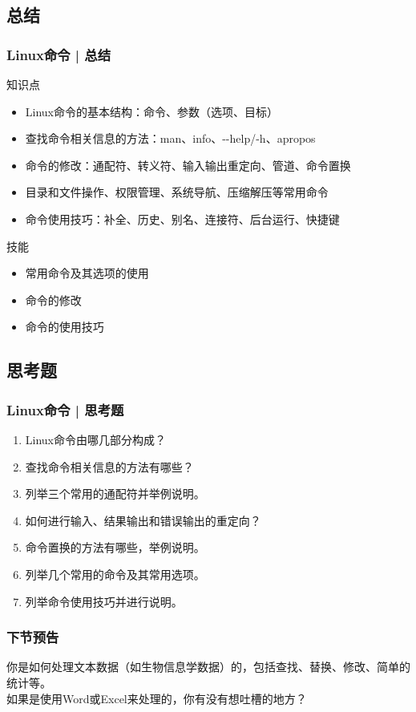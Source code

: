\subsection{总结}
\begin{frame}[fragile]
  \frametitle{Linux命令 | 总结}
  \begin{block}{知识点}
    \begin{itemize}
      \item Linux命令的基本结构：命令、参数（选项、目标）
      \item 查找命令相关信息的方法：man、info、-\!-help/-h、apropos
      \item 命令的修改：通配符、转义符、输入输出重定向、管道、命令置换
      \item 目录和文件操作、权限管理、系统导航、压缩解压等常用命令
      \item 命令使用技巧：补全、历史、别名、连接符、后台运行、快捷键
    \end{itemize}
  \end{block}
  \begin{block}{技能}
    \begin{itemize}
      \item 常用命令及其选项的使用
      \item 命令的修改
      \item 命令的使用技巧
    \end{itemize}
  \end{block}
\end{frame}

\subsection{思考题}
\begin{frame}
  \frametitle{Linux命令 | 思考题}
  \begin{enumerate}
    \item Linux命令由哪几部分构成？
    \item 查找命令相关信息的方法有哪些？
    \item 列举三个常用的通配符并举例说明。
    \item 如何进行输入、结果输出和错误输出的重定向？
    \item 命令置换的方法有哪些，举例说明。
    \item 列举几个常用的命令及其常用选项。
    \item 列举命令使用技巧并进行说明。
  \end{enumerate}
\end{frame}

\begin{frame}
  \frametitle{下节预告}
  你是如何处理文本数据（如生物信息学数据）的，包括查找、替换、修改、简单的统计等。\\
  如果是使用Word或Excel来处理的，你有没有想吐槽的地方？
\end{frame}





